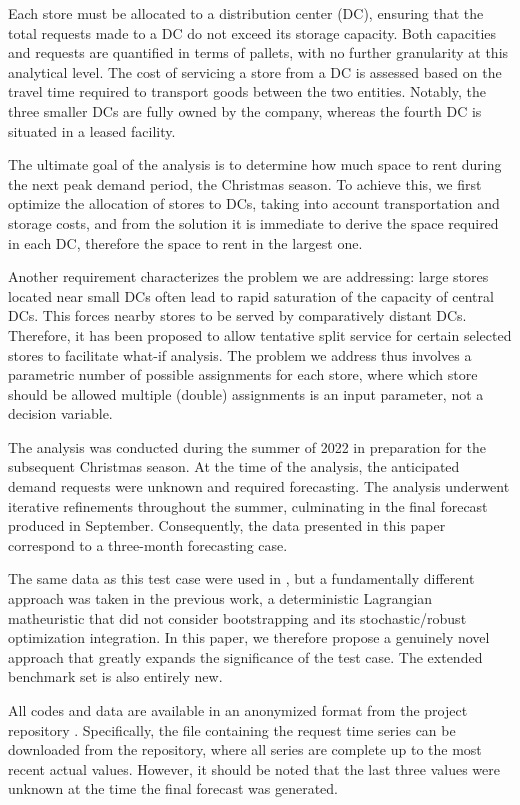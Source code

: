 \documentclass[preprint,11pt,authoryear]{elsarticle}
\begin{document}
Each store must be allocated to a distribution center (DC), ensuring that the total requests made to a DC do not exceed its storage capacity. Both capacities and requests are quantified in terms of pallets, with no further granularity at this analytical level. The cost of servicing a store from a DC is assessed based on the travel time required to transport goods between the two entities. Notably, the three smaller DCs are fully owned by the company, whereas the fourth DC is situated in a leased facility.

The ultimate goal of the analysis is to determine how much space to rent during the next peak demand period, the Christmas season. To achieve this, we first optimize the allocation of stores to DCs, taking into account transportation and storage costs, and from the solution it is immediate to derive the space required in each DC, therefore the space to rent in the largest one.

Another requirement characterizes the problem we are addressing: large stores located near small DCs often lead to rapid saturation of the capacity of central DCs. This forces nearby stores to be served by comparatively distant DCs. Therefore, it has been proposed to allow tentative split service for certain selected stores to facilitate what-if analysis. The problem we address thus involves a parametric number of possible assignments for each store, where which store should be allowed multiple (double) assignments is an input parameter, not a decision variable.  

The analysis was conducted during the summer of 2022 in preparation for the subsequent Christmas season. At the time of the analysis, the anticipated demand requests were unknown and required forecasting. The analysis underwent iterative refinements throughout the summer, culminating in the final forecast produced in September. Consequently, the data presented in this paper correspond to a three-month forecasting case. 

The same data as this test case were used in \citep{MZ23}, but a fundamentally different approach was taken in the previous work, a deterministic Lagrangian matheuristic that did not consider bootstrapping and its stochastic/robust optimization integration. In this paper, we therefore propose a genuinely novel approach that greatly expands the significance of the test case. The extended benchmark set is also entirely new.

All codes and data are available in an anonymized format from the project repository \citep{GDOforecastRepo}. Specifically, the file containing the request time series can be downloaded from the repository, where all series are complete up to the most recent actual values. However, it should be noted that the last three values were unknown at the time the final forecast was generated. 
\end{document}
